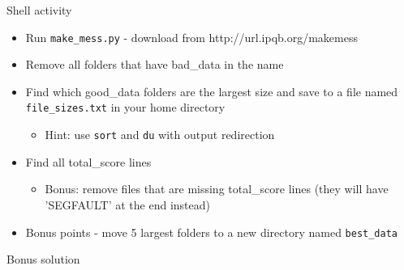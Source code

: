 \begin{frame}{Shell activity}
  \begin{itemize}
  \item Run \texttt{make\_mess.py} - download from http://url.ipqb.org/makemess
    \pause
  \item Remove all folders that have bad\_data in the name
  \item Find which good\_data folders are the largest size and save to
    a file named \texttt{file\_sizes.txt} in your home directory
    \begin{itemize}
    \item Hint: use \texttt{sort} and \texttt{du} with output redirection
    \end{itemize}
  \item Find all total\_score lines
    \begin{itemize}
    \item Bonus: remove files that are missing total\_score lines
      (they will have 'SEGFAULT' at the end instead)
    \end{itemize}
  \item Bonus points - move 5 largest folders to a new directory named
    \texttt{best\_data}
  \end{itemize}
\end{frame}

\begin{frame}{Bonus solution}
  \inputminted{bash}{code-snippets/bonus-shell-problem-solution.sh}
\end{frame}